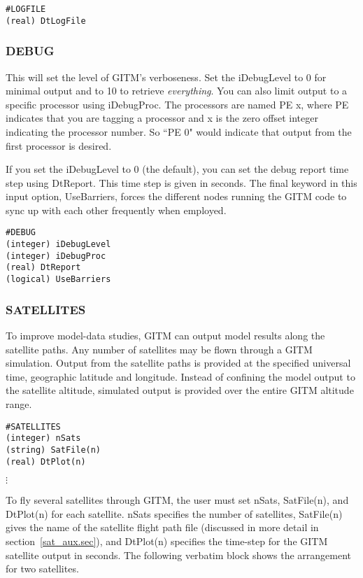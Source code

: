 \begin{verbatim}
#LOGFILE
(real) DtLogFile
\end{verbatim}

\subsubsection{DEBUG}
\label{debug.sec}

This will set the level of GITM's verboseness.  Set the iDebugLevel to 0 for minimal output and to 10 to retrieve \textit{everything}.  You can also limit output to a specific processor using iDebugProc.  The processors are named PE x, where PE indicates that you are tagging a processor and x is the zero offset integer indicating the processor number.  So ``PE 0" would indicate that output from the first processor is desired.

If you set the iDebugLevel to 0 (the default), you can set the debug report time step using DtReport.  This time step is given in seconds.  The final keyword in this input option, UseBarriers, forces the different nodes running the GITM code to sync up with each other frequently when employed.

\begin{verbatim}
#DEBUG
(integer) iDebugLevel
(integer) iDebugProc  
(real) DtReport    
(logical) UseBarriers 
\end{verbatim}

\subsubsection{SATELLITES}
\label{satellites.sec}

To improve model-data studies, GITM can output model results along the satellite paths.  Any number of satellites may be flown through a GITM simulation.  Output from the satellite paths is provided at the specified universal time, geographic latitude and longitude.  Instead of confining the model output to the satellite altitude, simulated output is provided over the entire GITM altitude range.

\begin{verbatim}
#SATELLITES
(integer) nSats
(string) SatFile(n)
(real) DtPlot(n)
\end{verbatim}
\vspace{-.1in}
\hspace{.6in} $\vdots$
\vspace{.1in}

To fly several satellites through GITM, the user must set nSats, SatFile(n), and DtPlot(n) for each satellite.  nSats specifies the number of satellites, SatFile(n) gives the name of the satellite flight path file (discussed in more detail in section~\ref{sat_aux.sec}), and DtPlot(n) specifies the time-step for the GITM satellite output in seconds.  The following verbatim block shows the arrangement for two satellites.

